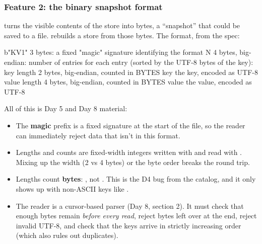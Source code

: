 \documentclass[10pt,a4paper]{article}
\begin{document}
\subsubsection{Feature 2: the binary snapshot format}
 turns the visible contents of the store into bytes, a “snapshot” that could be saved to a file.  rebuilds a store from those bytes. The format, from the spec:
\begin{txtcode}
b"KV1"            3 bytes: a fixed "magic" signature identifying the format
N                 4 bytes, big-endian: number of entries
for each entry (sorted by the UTF-8 bytes of the key):
    key length    2 bytes, big-endian, counted in BYTES
    key           the key, encoded as UTF-8
    value length  4 bytes, big-endian, counted in BYTES
    value         the value, encoded as UTF-8
\end{txtcode}
All of this is Day 5 and Day 8 material:
\begin{itemize}
\item The \textbf{magic} prefix is a fixed signature at the start of the file, so the reader can immediately reject data that isn’t in this format.
\item Lengths and counts are fixed-width integers written with  and read with . Mixing up the width (2 vs 4 bytes) or the byte order breaks the round trip.
\item Lengths count \textbf{bytes}: , not . This is the D4 bug from the catalog, and it only shows up with non-ASCII keys like .
\item The reader is a cursor-based parser (Day 8, section 2). It must check that enough bytes remain \emph{before every read}, reject bytes left over at the end, reject invalid UTF-8, and check that the keys arrive in strictly increasing order (which also rules out duplicates).
\end{itemize}
\end{document}
